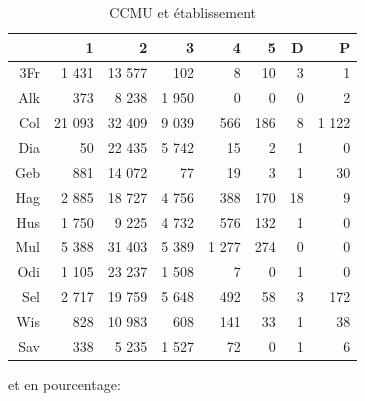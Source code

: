 \documentclass[12pt,english,french,twoside]{book}\usepackage[]{graphicx}\usepackage[]{color}
\begin{document}
\begin{table}[ht]
\centering
\begin{tabular}{rrrrrrrr}
  \hline
 & 1 & 2 & 3 & 4 & 5 & D & P \\ 
  \hline
3Fr & 1 431 & 13 577 & 102 & 8 & 10 & 3 & 1 \\ 
  Alk & 373 & 8 238 & 1 950 & 0 & 0 & 0 & 2 \\ 
  Col & 21 093 & 32 409 & 9 039 & 566 & 186 & 8 & 1 122 \\ 
  Dia & 50 & 22 435 & 5 742 & 15 & 2 & 1 & 0 \\ 
  Geb & 881 & 14 072 & 77 & 19 & 3 & 1 & 30 \\ 
  Hag & 2 885 & 18 727 & 4 756 & 388 & 170 & 18 & 9 \\ 
  Hus & 1 750 & 9 225 & 4 732 & 576 & 132 & 1 & 0 \\ 
  Mul & 5 388 & 31 403 & 5 389 & 1 277 & 274 & 0 & 0 \\ 
  Odi & 1 105 & 23 237 & 1 508 & 7 & 0 & 1 & 0 \\ 
  Sel & 2 717 & 19 759 & 5 648 & 492 & 58 & 3 & 172 \\ 
  Wis & 828 & 10 983 & 608 & 141 & 33 & 1 & 38 \\ 
  Sav & 338 & 5 235 & 1 527 & 72 & 0 & 1 & 6 \\ 
   \hline
\end{tabular}
\caption[CCMU et établissement]{CCMU et établissement} 
\end{table}


et en pourcentage:
\end{document}
